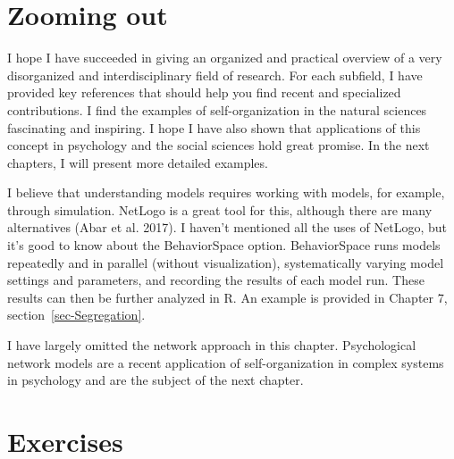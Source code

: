 \documentclass[
  a4paper,
  DIV=11,
  numbers=noendperiod,
  oneside]{scrreprt}
\begin{document}
\section{Zooming out}\label{sec-Zooming-out}

I hope I have succeeded in giving an organized and practical overview of
a very disorganized and interdisciplinary field of research. For each
subfield, I have provided key references that should help you find
recent and specialized contributions. I find the examples of
self-organization in the natural sciences fascinating and inspiring. I
hope I have also shown that applications of this concept in psychology
and the social sciences hold great promise. In the next chapters, I will
present more detailed examples.

I believe that understanding models requires working with models, for
example, through simulation. NetLogo is a great tool for this, although
there are many alternatives (Abar et al. 2017). I haven't mentioned all
the uses of NetLogo, but it's good to know about the BehaviorSpace
option. BehaviorSpace runs models repeatedly and in parallel (without
visualization), systematically varying model settings and parameters,
and recording the results of each model run. These results can then be
further analyzed in R. An example is provided in Chapter 7,
section~\ref{sec-Segregation}.

I have largely omitted the network approach in this chapter.
Psychological network models are a recent application of
self-organization in complex systems in psychology and are the subject
of the next chapter.

\section{Exercises}\label{sec-Exercises-ch5n}
\end{document}
